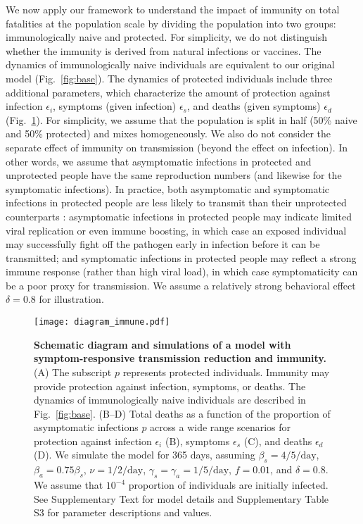 \documentclass[12pt]{article}
\newcommand{\fref}[1]{Fig.~\ref{fig:#1}}
\begin{document}
We now apply our framework to understand the impact of immunity on total fatalities at the population scale by dividing the population into two groups: immunologically naive and protected.
For simplicity, we do not distinguish whether the immunity is derived from natural infections or vaccines.
The dynamics of immunologically naive individuals are equivalent to our original model (\fref{base}).
The dynamics of protected individuals include three additional parameters, which characterize the amount of protection against infection $\epsilon_i$, symptoms (given infection) $\epsilon_s$, and deaths (given symptoms) $\epsilon_d$ (\fref{immune}).
For simplicity, we assume that the population is split in half (50\% naive and 50\% protected) and mixes homogeneously. We also do not consider the separate effect of immunity on transmission (beyond the effect on infection). 
In other words, we assume that asymptomatic infections in protected and unprotected people have the same reproduction numbers (and likewise for the symptomatic infections).
In practice, both asymptomatic and symptomatic infections in protected people are less likely to transmit than their unprotected counterparts \citep{lipsitch2020understanding}: asymptomatic infections in protected people may indicate limited viral replication or even immune boosting, in which case an exposed individual may successfully fight off the pathogen early in infection before it can be transmitted; and symptomatic infections in protected people may reflect a strong immune response (rather than high viral load), in which case symptomaticity can be a poor proxy for transmission.
We assume a relatively strong behavioral effect $\delta=0.8$ for illustration.

\begin{figure}[!ht]
\texttt{[image: diagram\_immune.pdf]}
\caption{
\textbf{Schematic diagram and simulations of a model with symptom-responsive transmission reduction and immunity.}
(A) The subscript $p$ represents protected individuals. 
Immunity may provide protection against infection, symptoms, or deaths.
The dynamics of immunologically naive individuals are described in \fref{base}.
(B--D) Total deaths as a function of the proportion of asymptomatic infections $p$ across a wide range scenarios for protection against infection $\epsilon_i$ (B), symptoms $\epsilon_s$ (C), and deaths $\epsilon_d$ (D).
We simulate the model for 365 days, assuming $\beta_s = 4/5/\mathrm{day}$, $\beta_a = 0.75 \beta_s$, $\nu=1/2/\mathrm{day}$, $\gamma_s=\gamma_a=1/5/\mathrm{day}$, $f=0.01$, and $\delta=0.8$.
We assume that $10^{-4}$ proportion of individuals are initially infected.
See Supplementary Text for model details and Supplementary Table S3 for parameter descriptions and values.
}
\label{fig:immune}
\end{figure}
\end{document}
